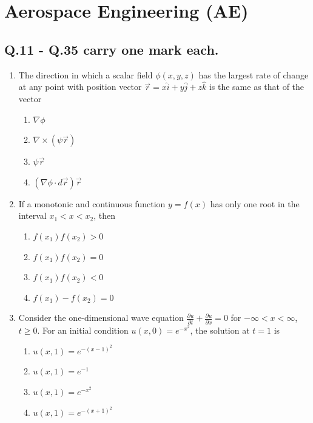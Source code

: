 \documentclass{article}
\begin{document}
\section*{Aerospace Engineering (AE)}
\subsection*{Q.11 - Q.35 carry one mark each.}

\begin{enumerate}[leftmargin=*, resume]
\item The direction in which a scalar field $\phi(x, y, z)$ has the largest rate of change at any point with position vector $\vec{r} = x\hat{i} + y\hat{j} + z\hat{k}$ is the same as that of the vector
\begin{multicols}{2}
\begin{enumerate}
\item $\nabla\phi$
\item $\nabla \times (\psi\vec{r})$
\item $\psi\vec{r}$
\item $(\nabla\phi \cdot d\vec{r})\vec{r}$
\end{enumerate}
\end{multicols}

\item If a monotonic and continuous function $y = f(x)$ has only one root in the interval $x_1 < x < x_2$, then
\begin{multicols}{4}
\begin{enumerate}
\item $f(x_1)f(x_2) > 0$
\item $f(x_1)f(x_2) = 0$
\item $f(x_1)f(x_2) < 0$
\item $f(x_1) - f(x_2) = 0$
\end{enumerate}
\end{multicols}

\item Consider the one-dimensional wave equation $\frac{\partial u}{\partial t} + \frac{\partial u}{\partial x} = 0$ for $-\infty < x < \infty$, $t \geq 0$. For an initial condition $u(x,0) = e^{-x^2}$, the solution at $t = 1$ is
\begin{multicols}{2}
\begin{enumerate}
\item $u(x,1) = e^{-(x-1)^2}$
\item $u(x,1) = e^{-1}$
\item $u(x,1) = e^{-x^2}$
\item $u(x,1) = e^{-(x+1)^2}$
\end{enumerate}
\end{multicols}


\end{enumerate}
\end{document}
